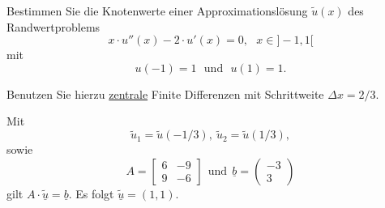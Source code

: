 Bestimmen Sie die Knotenwerte einer Approximationslösung $\tilde u(x)$
des Randwertproblems
\[
x \cdot u''(x) - 2 \cdot u'(x) = 0, \ \ \ x \in ]-1,1[
\]
mit
\[
u(-1) = 1 \ \ \ \text{und} \ \ \ u(1) = 1.
\]

Benutzen Sie hierzu \underline{zentrale} Finite Differenzen mit Schrittweite $\Delta x = 2/3$. 

\begin{loesung}
Mit 
\[
\tilde u_1 = \tilde u(-1/3), \ \tilde u_2 = \tilde u(1/3),
\]
sowie 
\[
A = \left[\begin{array}{rr} 
6 & -9 \\
9 & -6 \end{array}\right] \ \ \text{und} \ \
\underline{b} =  \left(\begin{array}{r} -3 \\ 3 \end{array}\right)
\]
gilt  $A \cdot \underline{\tilde u} = \underline{b}$.
Es folgt $\underline{\tilde u} = (1, 1).$
\end{loesung}

